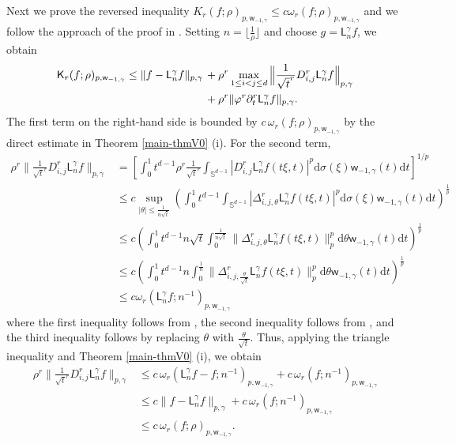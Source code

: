 \documentclass{amsart}
\theoremstyle{remark}
\def\d{\mathrm{d}}
\def\sph{{\mathbb{S}^{d-1}}}
\def\g{{\gamma}}
\def\t{{\theta}}
\def\o{{\omega}}
\def\d{\mathrm{d}}
\def\sph{{\mathbb{S}^{d-1}}}
\def\sK{{\mathsf K}}
\def\sL{{\mathsf L}}
\def\sw{{\mathsf w}}
\def\g{{\gamma}}
\def\t{{\theta}}
\def\o{{\omega}}
\def\f{\frac}
\def\f{\frac}
\begin{document}
Next we prove the reversed inequality $K_r(f; \rho)_{p,\sw_{-1,\g}}  \leq c \o_r(f; \rho)_{p,\sw_{-1,\g}}$ and we 
follow the approach of the proof in \cite[Theorem 6.10]{DaiX2}. Setting $n = \lfloor \f1\rho \rfloor$ and choose 
$g = \sL_n^\g f$, we obtain
\begin{align}\label{eqn2.21}
    \sK_r(f; \rho)_{p,\sw_{-1,\g}}  \leq \|f-\sL_n^\g f \|_{p,\g} \,& + \rho^r 
        \max_{1\leq i<j\leq d}\Big \|\f{1}{\sqrt{t}^r}D_{i,j}^r\sL_n^\g f \Big \|_{p,\g} \\
      & +\rho^r\|\varphi^r\partial_t^r \sL_n^\g f \|_{p,\g}. \notag
\end{align} 
The first term on the right-hand side is bounded by $c\,  \o_r(f; \rho)_{p,\sw_{-1,\g}} $ by the direct estimate in 
Theorem \ref{main-thmV0} (i). For the second term,  
\begin{align*}
    \rho^r \Big\|\f{1}{\sqrt{t}^r}D_{i,j}^r \sL_n^\g f \Big \|_{p,\g} 
   & = \left[  \int_0^1 t^{d-1} \rho^r \f{1}{\sqrt{t}^r} \int_{\sph}|D_{i,j}^r\sL_n^\g f(t\xi,t)|^p \d\sigma(\xi) \sw_{-1,\g}(t) \d t \right]^{1/p} \\ 
   & \le c \sup_{|\t|\leq \f1{n\sqrt{t}}} \left (\int_0^1 t^{d-1} \int_{\sph}|\Delta_{i,j,{\t}}^r \sL_n^\g f(t\xi,t)|^p \d\sigma(\xi)
      \sw_{-1,\g}(t) \d t\right)^{\f 1p}\\
      & \le c \left (\int_0^1 t^{d-1} n\sqrt{t}\int_{0}^{\f1{n\sqrt{t}}}\|\Delta_{i,j,{\t}}^r \sL_n^\g f(t\xi,t)\|_p^p \d\t
      \sw_{-1,\g}(t) \d t\right)^{\f 1p}\\
 & \le c \left (\int_0^1 t^{d-1} n \int_{0}^{\f1{n}}\Big \|\Delta_{i,j,{\f\t{\sqrt{t}}}}^r \sL_n^\g f(t\xi,t)\Big\|_p^p \d\t
 \sw_{-1,\g}(t) \d t\right)^{\f 1p}\\
   & \leq  c \o_r(\sL_n^\g f; n^{-1})_{p, \sw_{-1,\g}}
\end{align*}    
where the first inequality follows from     \cite[Lemma 2.6(iii)]{DaiX2},  the second inequality follows from \cite[Lemma 2.6(iv)]{DaiX2}, and the third inequality follows by replacing \(\theta\) with \(\frac{\theta}{\sqrt{t}}\).  
Thus, applying the triangle inequality and  Theorem \ref{main-thmV0} (i), we obtain
\begin{align*}
 \rho^r \Big \|\f{1}{\sqrt{t}^r}D_{i,j}^r \sL_n^\g f\Big \|_{p,\g} & \leq  c\, \o_r(\sL_n^\g f - f; n^{-1})_{p, \sw_{-1,\g}} 
 +   c\,\o_r( f; n^{-1})_{p, \sw_{-1,\g}}\\ 
   & \leq c\|f-\sL_n^\g f  \|_{p,\g}+c\,\o_r( f; n^{-1})_{p, \sw_{-1,\g}}\\&\leq c\, \o_r( f; \rho)_{p, \sw_{-1,\g}}. %
\end{align*}
\end{document}
